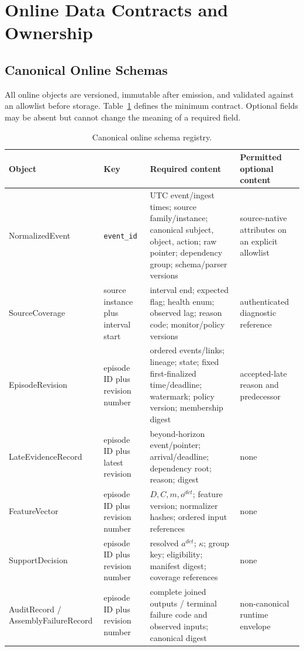 \appendix

\section{Online Data Contracts and Ownership}
\label{app:data-contracts}

\subsection{Canonical Online Schemas}

All online objects are versioned, immutable after emission, and validated against an allowlist
before storage. Table~\ref{tab:appendix-schemas} defines the minimum contract. Optional fields
may be absent but cannot change the meaning of a required field.

\begin{table}[t]
\caption{Canonical online schema registry.}
\label{tab:appendix-schemas}
\centering
\scriptsize
\begin{tabular}{p{}p{}p{}p{}}
\toprule
\textbf{Object} & \textbf{Key} & \textbf{Required content} & \textbf{Permitted optional content} \\
\midrule
NormalizedEvent & \texttt{event\_id} & UTC event/ingest times; source family/instance; canonical subject, object, action; raw pointer; dependency group; schema/parser versions & source-native attributes on an explicit allowlist \\
SourceCoverage & source instance plus interval start & interval end; expected flag; health enum; observed lag; reason code; monitor/policy versions & authenticated diagnostic reference \\
EpisodeRevision & episode ID plus revision number & ordered events/links; lineage; state; fixed first-finalized time/deadline; watermark; policy version; membership digest & accepted-late reason and predecessor \\
LateEvidenceRecord & episode ID plus latest revision & beyond-horizon event/pointer; arrival/deadline; dependency root; reason; digest & none \\
FeatureVector & episode ID plus revision number & $D,C,m,o^{det}$; feature version; normalizer hashes; ordered input references & none \\
SupportDecision & episode ID plus revision number & resolved $a^{det}$; $\kappa$; group key; eligibility; manifest digest; coverage references & none \\
AuditRecord / AssemblyFailureRecord & episode ID plus revision number & complete joined outputs / terminal failure code and observed inputs; canonical digest & non-canonical runtime envelope \\
\bottomrule
\end{tabular}
\end{table}

